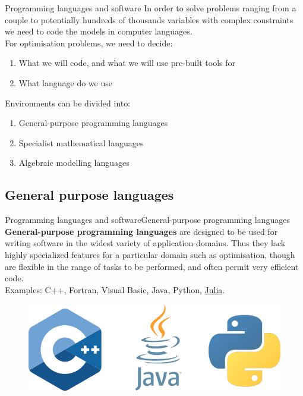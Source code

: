 \documentclass[handout]{beamer}
\begin{document}
\begin{frame}[t]{Programming languages and software}
  In order to solve problems ranging from a couple to potentially hundreds of thousands variables with complex constraints we need to code the models in computer languages.\\[12pt]

  For optimisation problems, we need to decide:
  
  \begin{enumerate}
    \item What we will code, and what we will use pre-built tools for
    \item What language do we use
  \end{enumerate}

  Environments can be divided into:
  \begin{enumerate}
    \item General-purpose programming languages
    \item Specialist mathematical languages
    \item Algebraic modelling languages
  \end{enumerate}

\end{frame}



\subsection{General purpose languages}
\begin{frame}{Programming languages and software}{General-purpose programming languages}
\textbf{General-purpose programming languages} are designed to be used for writing software in the widest variety of application domains. Thus they lack highly specialized features for a particular domain such as optimisation, though are flexible in the range of tasks to be performed, and often permit very efficient code.\\[6pt]

Examples: C++, Fortran, Visual Basic, Java, Python, \underline{Julia}.\\[12pt]

\begin{figure}
\begin{center}
\includegraphics[width=.60\textwidth]{GeneralLang.png}
\end{center}
\end{figure}

\end{frame}
\end{document}
